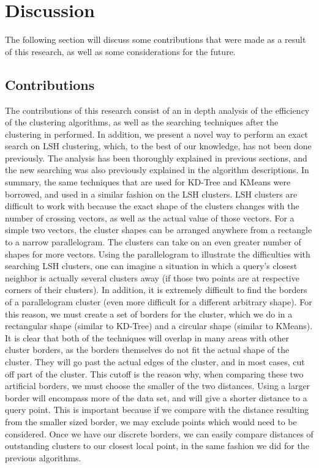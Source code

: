 \documentclass[journal]{IEEEtran}
\begin{document}
\section{Discussion}
The following section will discuss some contributions that were made as a result of this research, as well as some considerations for the future.
 \subsection{Contributions}
 The contributions of this research consist of an in depth analysis of the efficiency of the clustering algorithms, as well as the searching techniques after the clustering in performed. In addition, we present a novel way to perform an exact search on LSH clustering, which, to the best of our knowledge, has not been done previously. The analysis has been thoroughly explained in previous sections, and the new searching was also previously explained in the algorithm descriptions. In summary, the same techniques that are used for KD-Tree and KMeans were borrowed, and used in a similar fashion on the LSH clusters. LSH clusters are difficult to work with because the exact shape of the clusters changes with the number of crossing vectors, as well as the actual value of those vectors. For a simple two vectors, the cluster shapes can be arranged anywhere from a rectangle to a narrow parallelogram. The clusters can take on an even greater number of shapes for more vectors. Using the parallelogram to illustrate the difficulties with searching LSH clusters, one can imagine a situation in which a query's closest neighbor is actually several clusters away (if those two points are at respective corners of their clusters). In addition, it is extremely difficult to find the borders of a parallelogram cluster (even more difficult for a different arbitrary shape). For this reason, we must create a set of borders for the cluster, which we do in a rectangular shape (similar to KD-Tree) and a circular shape (similar to KMeans). It is clear that both of the techniques will overlap in many areas with other cluster borders, as the borders themselves do not fit the actual shape of the cluster. They will go past the actual edges of the cluster, and in most cases, cut off part of the cluster. This cutoff is the reason why, when comparing these two artificial borders, we must choose the smaller of the two distances. Using a larger border will encompass more of the data set, and will give a shorter distance to a query point. This is important because if we compare with the distance resulting from the smaller sized border, we may exclude points which would need to be considered. Once we have our discrete borders, we can easily compare distances of outstanding clusters to our closest local point, in the same fashion we did for the previous algorithms. 
 
\end{document}
